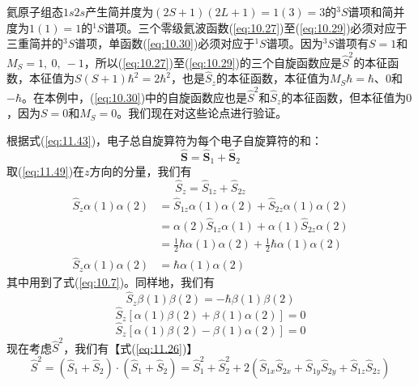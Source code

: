     氦原子组态$1s2s$产生简并度为$\left(2S+1\right)\left(2L+1\right)=1\left(3\right)=3$的$^3S$谱项和简并度为$1\left(1\right)=1$的$^1S$谱项。三个零级氦波函数(\ref{eq:10.27})至(\ref{eq:10.29})必须对应于三重简并的$^3S$谱项，单函数(\ref{eq:10.30})必须对应于$^1S$谱项。因为$^3S$谱项有$S=1$和$M_S = 1,\:0,\:-1$，所以(\ref{eq:10.27})至(\ref{eq:10.29})的三个自旋函数应是$\hat{S}^2$的本征函数，本征值为$S\left(S+1\right)\hbar^2 = 2\hbar^2$，也是$\hat{S}_z$的本征函数，本征值为$M_S\hbar = \hbar$、$0$和$-\hbar$。在本例中，(\ref{eq:10.30})中的自旋函数应也是$\hat{S}^2$和$\hat{S}_z$的本征函数，但本征值为$0$，因为$S=0$和$M_S=0$。我们现在对这些论点进行验证。

    根据式(\ref{eq:11.43})，电子总自旋算符为每个电子自旋算符的和：
    \begin{equation}
        \hat{\mathbf{S}} = \hat{\mathbf{S}}_1 + \hat{\mathbf{S}}_2
        \label{eq:11.49}
    \end{equation}
    取(\ref{eq:11.49})在$z$方向的分量，我们有
    \begin{equation}
        \hat{S}_z = \hat{S}_{1z} + \hat{S}_{2z}
        \label{eq:11.50}
    \end{equation}
    \begin{align}
        \hat{S}_z \alpha(1)\alpha(2) &= \hat{S}_{1z} \alpha(1)\alpha(2) + \hat{S}_{2z} \alpha(1)\alpha(2) \nonumber\\
        &=\alpha(2)\hat{S}_{1z}\alpha(1) + \alpha(1)\hat{S}_{2z}\alpha(2) \nonumber\\
        &= \frac{1}{2}\hbar\alpha(1)\alpha(2) + \frac{1}{2}\hbar\alpha(1)\alpha(2) \nonumber \\
        \hat{S}_z \alpha (1) \alpha (2) &= \hbar \alpha (1) \alpha (2) \label{eq:11.51}
    \end{align}
    其中用到了式(\ref{eq:10.7})。同样地，我们有
    \begin{equation}
        \hat{S}_z \beta(1)\beta(2) = -\hbar \beta(1)\beta(2)
        \label{eq:11.52}
    \end{equation}
    \begin{equation}
        \hat{S}_z \left[\alpha (1)\beta (2) + \beta (1)\alpha (2)\right] = 0
        \label{eq:11.53}
    \end{equation}
    \begin{equation}
        \hat{S}_{z} \left[\alpha (1) \beta (2) - \beta (1)\alpha (2)\right] = 0
        \label{eq:11.54}
    \end{equation}
    现在考虑$\hat{S}^2$，我们有【式(\ref{eq:11.26})】
    \begin{equation}
        \hat{S}^2 = (\hat{S}_1 + \hat{S}_2) \cdot (\hat{S}_1 + \hat{S}_2) = \hat{S}_1^2 + \hat{S}_2^2 + 2 (\hat{S}_{1x} \hat{S}_{2x} + \hat{S}_{1y} \hat{S}_{2y} + \hat{S}_{1z} \hat{S}_{2z})
        \label{eq:11.55}
    \end{equation}
